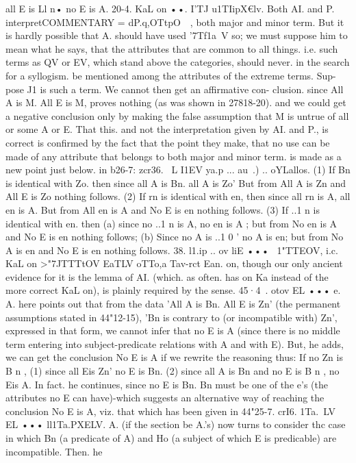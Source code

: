 {{{{{{{{{{{{{{{{{{{all E is Ll n• no E is A.
20-4. KaL on ••. I'TJ u1TIipX€lv. Both AI. and P. interpretCOMMENTARY
= dP.q,OTtpO~~, both major and minor term. But it is
hardly possible that A. should have used '7Tf1a~V so; we must
suppose him to mean what he says, that the attributes that are
common to all things. i.e. such terms as QV or EV, which stand
above the categories, should never. in the search for a syllogism.
be mentioned among the attributes of the extreme terms. Sup-
pose J1 is such a term. We cannot then get an affirmative con-
clusion. since All A is M. All E is M, proves nothing (as was
shown in 27818-20). and we could get a negative conclusion only
by making the false assumption that M is untrue of all or some
A or E.
That this. and not the interpretation given by AI. and P., is
correct is confirmed by the fact that the point they make, that
no use can be made of any attribute that belongs to both major
and minor term. is made as a new point just below. in b26-7:
zcr36. ~L I1EV ya.p ... au~.) .. oYLallos. (1) If Bn is identical with
Zo. then since all A is Bn. all A is Zo' But from All A is Zn and
All E is Zo nothing follows. (2) If rn is identical with en, then
since all rn is A, all en is A. But from All en is A and No E is
en nothing follows. (3) If ..1 n is identical with en. then (a) since
no ..1 n is A, no en is A ; but from No en is A and No E is en
nothing follows; (b) Since no A is ..1 0 ' no A is en; but from No
A is en and No E is en nothing follows.
38. l1.ip .. ov liE ••• ~1"TTEOV, i.c. KaL on >"7JTTTtOV EaTLV oTTo,a Tav-rct
Ean. on, though our only ancient evidence for it is the lemma of
AI. (which. as often. has on Ka{ instead of the more correct KaL on),
is plainly required by the sense.
45·4~. otov EL ••• e. A. here points out that from the data
'All A is Bn. All E is Zn' (the permanent assumptions stated in
44"12-15), 'Bn is contrary to (or incompatible with) Zn', expressed
in that form, we cannot infer that no E is A (since there is no
middle term entering into subject-predicate relations with A
and with E). But, he adds, we can get the conclusion No E is A
if we rewrite the reasoning thus: If no Zn is B n , (1) since all Eis
Zn' no E is Bn. (2) since all A is Bn and no E is B n , no Eis A. In
fact. he continues, since no E is Bn. Bn must be one of the e's
(the attributes no E can have)-which suggests an alternative
way of reaching the conclusion No E is A, viz. that which has
been given in 44"25-7.
crI6. 1Ta.~LV EL ••• ll1Ta.PXELV. A. (if the section be A.'s) now
turns to consider thc case in which Bn (a predicate of A) and Ho
(a subject of which E is predicable) are incompatible. Then. he
}}}}}}}}}}}}}}}}}}}}
